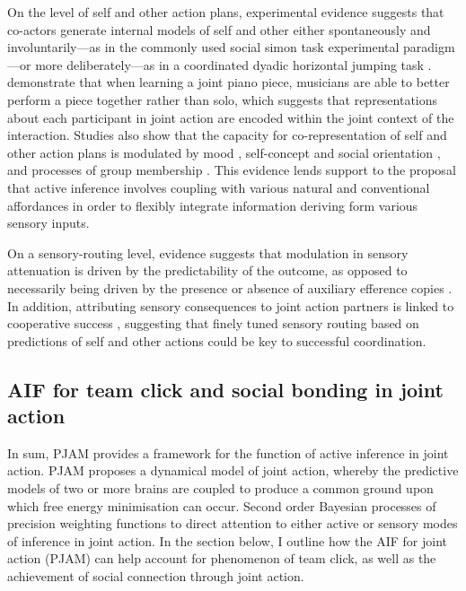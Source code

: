 \begin{CJK}{UTF8}{gbsn}
On the level of self and other action plans, experimental evidence suggests that co-actors generate internal models of self and other either spontaneously and involuntarily---as in the commonly used social simon task experimental paradigm \citep{Sebanz2003,Atmaca2008}---or more deliberately---as in a coordinated dyadic horizontal jumping task \citep{Vesper2012}.  \textcite{Loehr2016} demonstrate that when learning a joint piano piece, musicians are able to better perform a piece together rather than solo, which suggests that representations about each participant in joint action are encoded within the joint context of the interaction.  Studies also show that the capacity for co-representation of self and other action plans is modulated by mood \citep[positive or negative affect, see][]{Kuhbandner2010}, self-concept and social orientation \citep{Colzato2012,Colzato2012a}, and processes of group membership \citep{DeBruijn2008,Iani2013}. This evidence lends support to the proposal that active inference involves coupling with various natural and conventional affordances in order to flexibly integrate information deriving form various sensory inputs.


On a sensory-routing level, evidence suggests that modulation in sensory attenuation is driven by the predictability of the outcome, as opposed to necessarily being driven by the presence or absence of auxiliary efference copies \citep{Sato2008}.  In addition, attributing sensory consequences to joint action partners is linked to cooperative success \citep{Chaminade2012}, suggesting that finely tuned sensory routing based on predictions of self and other actions could be key to successful coordination.



\subsection{AIF for team click and social bonding in joint action\label{sect:AIFclickBonding}}

In sum, PJAM provides a framework for the function of active inference in joint action.  PJAM proposes a dynamical model of joint action, whereby the predictive models of two or more brains are coupled to produce a common ground upon which free energy minimisation can occur. Second order Bayesian processes of precision weighting functions to direct attention to either active or sensory modes of inference in joint action.   In the section below, I outline how the AIF for joint action (PJAM) can help account for  phenomenon of team click, as well as the achievement of social connection through joint action.


\end{CJK}

